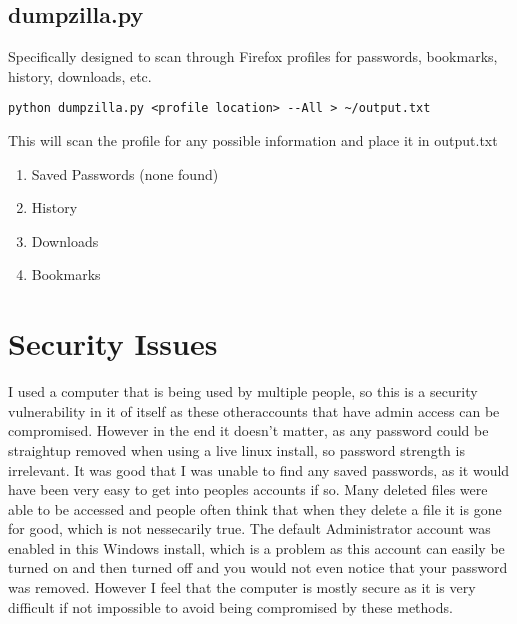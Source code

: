 \documentclass[a4paper, 11pt]{article}
\begin{document}
\subsection*{dumpzilla.py}
Specifically designed to scan through Firefox profiles for passwords, bookmarks, history, downloads, etc.
\begin{lstlisting}
python dumpzilla.py <profile location> --All > ~/output.txt
\end{lstlisting}
This will scan the profile for any possible information and place it in output.txt
\begin{enumerate}
\item Saved Passwords (none found)
\item History
\item Downloads
\item Bookmarks
\end{enumerate}

\section*{Security Issues}
I used a computer that is being used by multiple people, so this is a security vulnerability in it of itself as these otheraccounts that have admin access can be compromised.  However in the end it doesn't matter, as any password could be straightup removed when using a live linux install, so password strength is irrelevant.  It was good that I was unable to find any saved passwords, as it would have been very easy to get into peoples accounts if so.  Many deleted files were able to be accessed and people often think that when they delete a file it is gone for good, which is not nessecarily true.  The default Administrator account was enabled in this Windows install, which is a problem as this account can easily be turned on and then turned off and you would not even notice that your password was removed.  However I feel that the computer is mostly secure as it is very difficult if not impossible to avoid being compromised by these methods.
\end{document}
